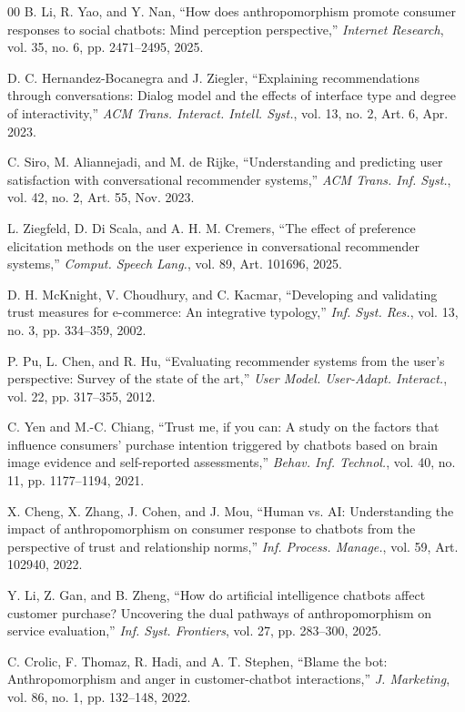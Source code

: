 \documentclass[conference]{IEEEtran}
\begin{document}
\begin{thebibliography}{00}
B. Li, R. Yao, and Y. Nan, ``How does anthropomorphism promote consumer responses to
social chatbots: Mind perception perspective,'' \textit{Internet Research},
vol. 35, no. 6, pp. 2471--2495, 2025.

D. C. Hernandez-Bocanegra and J. Ziegler, ``Explaining recommendations through
conversations: Dialog model and the effects of interface type and degree of
interactivity,'' \textit{ACM Trans. Interact. Intell. Syst.}, vol. 13, no. 2,
Art. 6, Apr. 2023.

C. Siro, M. Aliannejadi, and M. de Rijke, ``Understanding and predicting user
satisfaction with conversational recommender systems,'' \textit{ACM Trans. Inf.
Syst.}, vol. 42, no. 2, Art. 55, Nov. 2023.

L. Ziegfeld, D. Di Scala, and A. H. M. Cremers, ``The effect of preference
elicitation methods on the user experience in conversational recommender systems,''
\textit{Comput. Speech Lang.}, vol. 89, Art. 101696, 2025.

D. H. McKnight, V. Choudhury, and C. Kacmar, ``Developing and validating trust
measures for e-commerce: An integrative typology,'' \textit{Inf. Syst. Res.},
vol. 13, no. 3, pp. 334--359, 2002.

P. Pu, L. Chen, and R. Hu, ``Evaluating recommender systems from the user's
perspective: Survey of the state of the art,'' \textit{User Model. User-Adapt.
Interact.}, vol. 22, pp. 317--355, 2012.

C. Yen and M.-C. Chiang, ``Trust me, if you can: A study on the factors that
influence consumers' purchase intention triggered by chatbots based on brain image
evidence and self-reported assessments,'' \textit{Behav. Inf. Technol.}, vol. 40,
no. 11, pp. 1177--1194, 2021.

X. Cheng, X. Zhang, J. Cohen, and J. Mou, ``Human vs. AI: Understanding the impact
of anthropomorphism on consumer response to chatbots from the perspective of trust
and relationship norms,'' \textit{Inf. Process. Manage.}, vol. 59, Art. 102940,
2022.

Y. Li, Z. Gan, and B. Zheng, ``How do artificial intelligence chatbots affect
customer purchase? Uncovering the dual pathways of anthropomorphism on service
evaluation,'' \textit{Inf. Syst. Frontiers}, vol. 27, pp. 283--300, 2025.

C. Crolic, F. Thomaz, R. Hadi, and A. T. Stephen, ``Blame the bot: Anthropomorphism
and anger in customer-chatbot interactions,'' \textit{J. Marketing}, vol. 86, no. 1,
pp. 132--148, 2022.


\end{thebibliography}
\end{document}
